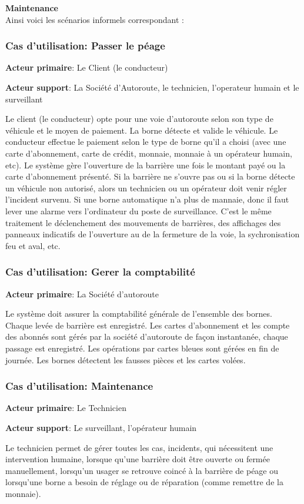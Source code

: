 \textbf{Maintenance }%
\\

Ainsi voici les scénarios informels correspondant :
\subsubsection{\textbf{Cas d’utilisation:} Passer le péage } \label{subsubsec:passerL} 
\textbf{Acteur primaire}: Le Client (le conducteur) 

\textbf{Acteur support}: La Société d’Autoroute, le technicien, l’operateur humain et le surveillant

Le client (le conducteur) opte pour une voie d’autoroute selon son type de véhicule et le moyen de paiement. La borne détecte et valide le véhicule. Le conducteur effectue le paiement selon le type de borne qu’il a choisi (avec une carte d’abonnement, carte de crédit, monnaie, monnaie à un opérateur humain, etc). Le système gère l’ouverture de la barrière une fois le montant payé ou la carte d’abonnement présenté. Si la barrière ne s’ouvre pas ou si la borne détecte un véhicule non autorisé, alors un technicien ou un opérateur doit venir régler l’incident survenu. Si une borne automatique n'a plus de mannaie, donc il faut lever une alarme vers l'ordinateur du poste de surveillance. C'est le même traitement le déclenchement des mouvements de barrières, des affichages des panneaux indicatifs de l'ouverture au de la fermeture de la voie, la sychronisation feu et aval, etc.

\subsubsection{\textbf{Cas d’utilisation:} Gerer la comptabilité}  \label{subsubsec:gerer}
\textbf{Acteur primaire}: La Société d'autoroute 

Le système doit assurer la comptabilité générale de l’ensemble des bornes. Chaque levée de barrière est enregistré. Les cartes d’abonnement et les compte des abonnés sont gérés par la société d’autoroute de façon instantanée, chaque passage est enregistré. Les opérations par cartes bleues sont gérées en fin de journée. Les bornes détectent les fausses pièces et les cartes volées.

\subsubsection{\textbf{Cas d’utilisation:} Maintenance}  \label{subsubsec:maint}
\textbf{Acteur primaire}: Le Technicien 

\textbf{Acteur support}: Le surveillant, l’opérateur humain

Le technicien permet de gérer toutes les cas, incidents, qui nécessitent une intervention humaine, lorsque qu’une barrière doit être ouverte ou fermée manuellement, lorsqu’un usager se retrouve coincé à la barrière de péage ou lorsqu’une borne a besoin de réglage ou de réparation (comme remettre de la monnaie).
